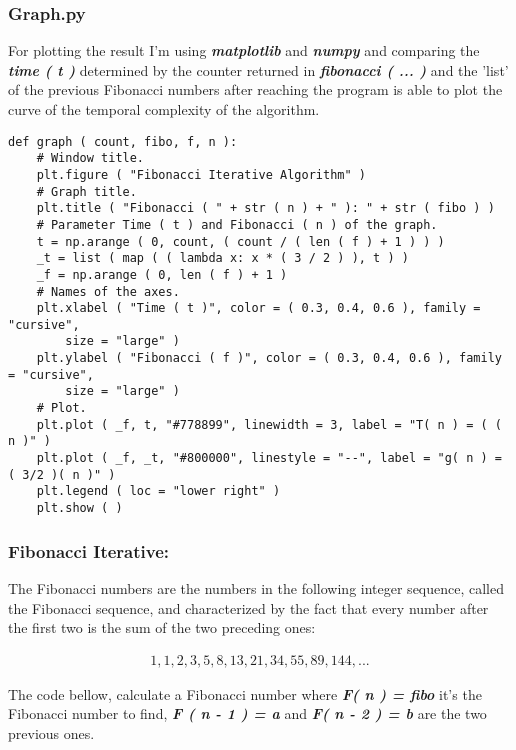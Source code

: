 \documentclass[10pt,a4paper]{article}
\begin{document}
\subsubsection{Graph.py}

For plotting the result I’m using {\bfseries\itshape matplotlib} and {\bfseries\itshape numpy}  and comparing the {\bfseries\itshape time ( t )}  determined by the counter returned in {\bfseries\itshape fibonacci ( ... )} and the ’list’ of the previous Fibonacci numbers after reaching  the program is able to plot the curve of the temporal complexity of the algorithm. \hfill \break

\begin{lstlisting}
def graph ( count, fibo, f, n ):
    # Window title.
    plt.figure ( "Fibonacci Iterative Algorithm" )
    # Graph title.
    plt.title ( "Fibonacci ( " + str ( n ) + " ): " + str ( fibo ) )
    # Parameter Time ( t ) and Fibonacci ( n ) of the graph.
    t = np.arange ( 0, count, ( count / ( len ( f ) + 1 ) ) )
    _t = list ( map ( ( lambda x: x * ( 3 / 2 ) ), t ) )
    _f = np.arange ( 0, len ( f ) + 1 )
    # Names of the axes.
    plt.xlabel ( "Time ( t )", color = ( 0.3, 0.4, 0.6 ), family = "cursive", 
    	size = "large" )
    plt.ylabel ( "Fibonacci ( f )", color = ( 0.3, 0.4, 0.6 ), family = "cursive", 
    	size = "large" )
    # Plot.
    plt.plot ( _f, t, "#778899", linewidth = 3, label = "T( n ) = ( ( n )" )
    plt.plot ( _f, _t, "#800000", linestyle = "--", label = "g( n ) = ( 3/2 )( n )" )
    plt.legend ( loc = "lower right" )
    plt.show ( )
\end{lstlisting} \pagebreak

\subsubsection{Fibonacci Iterative:}

The Fibonacci numbers are the numbers in the following integer sequence, called the Fibonacci sequence, and characterized by the fact that every number after the first two is the sum of the two preceding ones:

\begin{ceqn}
\begin{align}
1, 1, 2, 3, 5, 8, 13, 21, 34, 55, 89, 144, ...
\end{align}
\end{ceqn}

The code bellow, calculate a Fibonacci number where {\bfseries\itshape F( n ) = fibo} it's the Fibonacci number to find, {\bfseries\itshape F ( n - 1 ) = a} and {\bfseries\itshape F( n - 2 ) = b} are the two previous ones. \hfill \break
\end{document}
